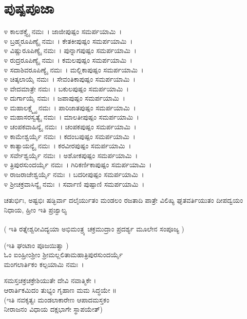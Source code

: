 \section{ಪುಷ್ಪಪೂಜಾ}
೪ ಕಾಲಶಕ್ತ್ಯೈ ನಮಃ~। ಜಾಜೀಪುಷ್ಪಂ ಸಮರ್ಪಯಾಮಿ~।\\
೪ ಬ್ರಹ್ಮರೂಪಿಣ್ಯೈ ನಮಃ~। ಕೇತಕೀಪುಷ್ಪಂ ಸಮರ್ಪಯಾಮಿ~।\\
೪ ವಿಷ್ಣುರೂಪಿಣ್ಯೈ ನಮಃ~। ಪುನ್ನಾಗಪುಷ್ಪಂ ಸಮರ್ಪಯಾಮಿ~।\\
೪ ರುದ್ರರೂಪಿಣ್ಯೈ ನಮಃ~। ಕಮಲಪುಷ್ಪಂ ಸಮರ್ಪಯಾಮಿ~।\\
೪ ಸದಾಶಿವರೂಪಿಣ್ಯೈ ನಮಃ~। ಮಲ್ಲಿಕಾಪುಷ್ಪಂ ಸಮರ್ಪಯಾಮಿ~।\\
೪ ಚಿತ್ಕಲಾಯೈ ನಮಃ~। ಸೇವಂತಿಕಾಪುಷ್ಪಂ ಸಮರ್ಪಯಾಮಿ~।\\
೪ ವೇದಮಾತ್ರೇ ನಮಃ~। ಬಕುಲಪುಷ್ಪಂ ಸಮರ್ಪಯಾಮಿ~।\\
೪ ದುರ್ಗಾಯೈ ನಮಃ~। ಜಪಾಪುಷ್ಪಂ ಸಮರ್ಪಯಾಮಿ~।\\
೪ ಮಹಾಲಕ್ಷ್ಮ್ಯೈ ನಮಃ~। ಪಾರಿಜಾತಪುಷ್ಪಂ ಸಮರ್ಪಯಾಮಿ~।\\
೪ ಮಹಾಸರಸ್ವತ್ಯೈ ನಮಃ~। ಮಾಲತೀಪುಷ್ಪಂ ಸಮರ್ಪಯಾಮಿ~।\\
೪ ಚಂಪಕವಾಹಿನ್ಯೈ ನಮಃ~। ಚಂಪಕಪುಷ್ಪಂ ಸಮರ್ಪಯಾಮಿ~।\\
೪ ಕಾಮೇಶ್ವರ್ಯೈ ನಮಃ~। ಕದಂಬಪುಷ್ಪಂ ಸಮರ್ಪಯಾಮಿ~।\\
೪ ಕಾತ್ಯಾಯನ್ಯೈ ನಮಃ~। ಕರವೀರಪುಷ್ಪಂ ಸಮರ್ಪಯಾಮಿ~।\\
೪ ಸರ್ವೇಶ್ವರ್ಯೈ ನಮಃ~। ಅಶೋಕಪುಷ್ಪಂ ಸಮರ್ಪಯಾಮಿ~।\\
೪ ತ್ರಿಪುರಸುಂದರ್ಯೈ ನಮಃ~। ಗಿರಿಕರ್ಣಿಕಾಪುಷ್ಪಂ ಸಮರ್ಪಯಾಮಿ~।\\
೪ ರಾಜರಾಜೇಶ್ವರ್ಯೈ ನಮಃ~। ಬದರೀಪುಷ್ಪಂ ಸಮರ್ಪಯಾಮಿ~।\\
೪ ಶ್ರೀಚಕ್ರವಾಸಿನ್ಯೈ ನಮಃ~। ಸರ್ವಾಣಿ ಪುಷ್ಪಾಣಿ ಸಮರ್ಪಯಾಮಿ~।

{ಚತುರ್ಭಿಃ, ಅಷ್ಟಭಿಃ ಷಡ್ಭಿರ್ವಾ ದಲೈರ್ಯುತಂ ಮಂಡಲಂ ರಜತಾದಿ ಪಾತ್ರೇ ವಿಲಿಖ್ಯ ಘೃತವರ್ತಿಯುತಂ ದೀಪದ್ವಯಂ ನಿಧಾಯ, ಹ್ರೀಂ ಇತಿ ಪ್ರಜ್ವಾಲ್ಯ}\\
\\( ಇತಿ ರತ್ನೇಶ್ವರೀವಿದ್ಯಯಾ ಅಭಿಮಂತ್ರ್ಯ  ಚಕ್ರಮುದ್ರಾಂ ಪ್ರದರ್ಶ್ಯ ಮೂಲೇನ ಸಂಪೂಜ್ಯ )

 (ಇತಿ ಘಂಟಾಂ ಪೂಜಯಿತ್ವಾ )\\
ಓಂ ಐಂಹ್ರೀಂಶ್ರೀಂ ಶ್ರೀಮಲ್ಲಲಿತಾಮಹಾತ್ರಿಪುರಸುಂದರ್ಯೈ \\ಮಂಗಲಾರ್ತಿಕಂ ಕಲ್ಪಯಾಮಿ ನಮಃ~।

ಸಮಸ್ತಚಕ್ರಚಕ್ರೇಶಿಯುತೇ ದೇವಿ ನವಾತ್ಮಿಕೇ ।\\
ಆರಾರ್ತಿಕಮಿದಂ ತುಭ್ಯಂ ಗೃಹಾಣ ಮಮ ಸಿದ್ಧಯೇ ॥\\
 (ಇತಿ ನವಕೃತ್ವಃ ಮಂಡಲಾಕಾರೇಣ ಆಪಾದಮಸ್ತಕಂ\\
  ನೀರಾಜನಂ ವಿಧಾಯ ದಕ್ಷಭಾಗೇ ಸ್ಥಾಪಯೇತ್)

